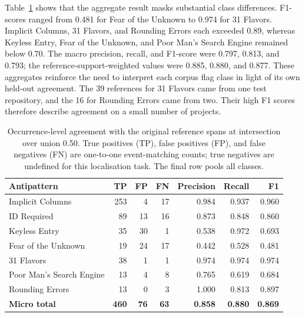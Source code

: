 Table~\ref{tab:toolDetections} shows that the aggregate result masks substantial class differences. F1-scores ranged from \num{0.481} for Fear of the Unknown to \num{0.974} for 31 Flavors. Implicit Columns, 31 Flavors, and Rounding Errors each exceeded \num{0.89}, whereas Keyless Entry, Fear of the Unknown, and Poor Man's Search Engine remained below \num{0.70}. The macro precision, recall, and F1-score were \num{0.797}, \num{0.813}, and \num{0.793}; the reference-support-weighted values were \num{0.885}, \num{0.880}, and \num{0.877}. These aggregates reinforce the need to interpret each corpus flag class in light of its own held-out agreement. The \num{39} references for 31 Flavors came from one test repository, and the \num{16} for Rounding Errors came from two. Their high F1 scores therefore describe agreement on a small number of projects.

\begin{table}[H]
    \centering
    \small
    \caption{Occurrence-level agreement with the original reference spans at intersection over union \num{0.50}. True positives (TP), false positives (FP), and false negatives (FN) are one-to-one event-matching counts; true negatives are undefined for this localisation task. The final row pools all classes.}
    \label{tab:toolDetections}
    \begin{tabular}{lrrrrrr}
        \hline
        \textbf{Antipattern} & \textbf{TP} & \textbf{FP} & \textbf{FN} & \textbf{Precision} & \textbf{Recall} & \textbf{F1} \\
        \hline
        Implicit Columns & 253 & 4 & 17 & 0.984 & 0.937 & 0.960 \\
        ID Required & 89 & 13 & 16 & 0.873 & 0.848 & 0.860 \\
        Keyless Entry & 35 & 30 & 1 & 0.538 & 0.972 & 0.693 \\
        Fear of the Unknown & 19 & 24 & 17 & 0.442 & 0.528 & 0.481 \\
        31 Flavors & 38 & 1 & 1 & 0.974 & 0.974 & 0.974 \\
        Poor Man's Search Engine & 13 & 4 & 8 & 0.765 & 0.619 & 0.684 \\
        Rounding Errors & 13 & 0 & 3 & 1.000 & 0.813 & 0.897 \\
        \textbf{Micro total} & \textbf{460} & \textbf{76} & \textbf{63} & \textbf{0.858} & \textbf{0.880} & \textbf{0.869} \\
        \hline
    \end{tabular}
\end{table}

